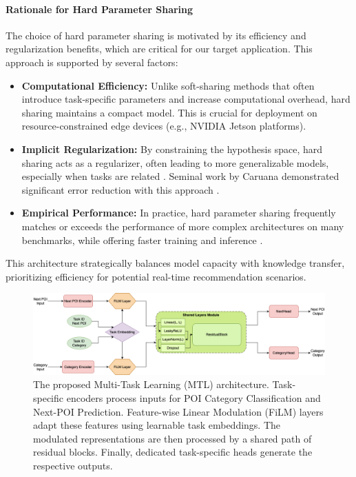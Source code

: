 \paragraph*{Rationale for Hard Parameter Sharing}
The choice of hard parameter sharing is motivated by its efficiency and regularization benefits, which are critical for our target application. This approach is supported by several factors:
\begin{itemize}
    \item \textbf{Computational Efficiency:} Unlike soft-sharing methods that often introduce task-specific parameters and increase computational overhead, hard sharing maintains a compact model. This is crucial for deployment on resource-constrained edge devices (e.g., NVIDIA Jetson platforms).
    \item \textbf{Implicit Regularization:} By constraining the hypothesis space, hard sharing acts as a regularizer, often leading to more generalizable models, especially when tasks are related \cite{ruder2017sluice}. Seminal work by Caruana demonstrated significant error reduction with this approach \cite{caruana1997multitask}.
    \item \textbf{Empirical Performance:} In practice, hard parameter sharing frequently matches or exceeds the performance of more complex architectures on many benchmarks, while offering faster training and inference \cite{standley2020tasks}.
\end{itemize}
This architecture strategically balances model capacity with knowledge transfer, prioritizing efficiency for potential real-time recommendation scenarios.

\begin{figure}[htbp]
    \centering
    \includegraphics[width=\textwidth]{imgs/mtlnet_poi.drawio.png}
    \caption{The proposed Multi-Task Learning (MTL) architecture. Task-specific encoders process inputs for POI Category Classification and Next-POI Prediction. Feature-wise Linear Modulation (FiLM) layers adapt these features using learnable task embeddings. The modulated representations are then processed by a shared path of residual blocks. Finally, dedicated task-specific heads generate the respective outputs.}
    \label{fig:arch}
\end{figure}
%
%
